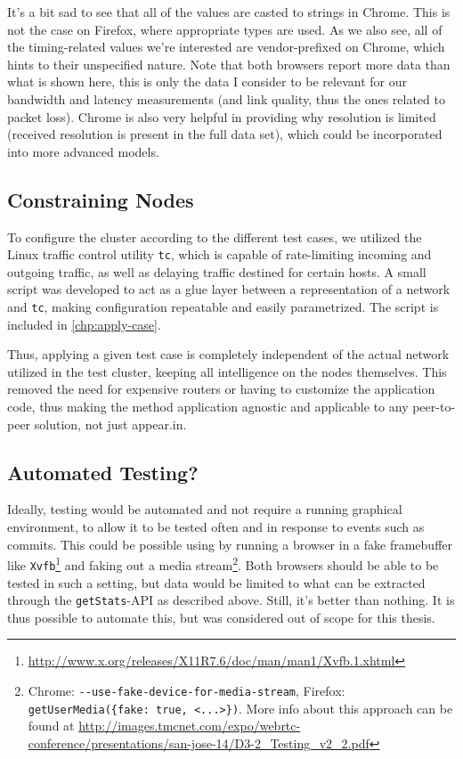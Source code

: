 It's a bit sad to see that all of the values are casted to strings in Chrome. This is not the case on Firefox, where appropriate types are used. As we also see, all of the timing-related values we're interested are vendor-prefixed on Chrome, which hints to their unspecified nature. Note that both browsers report more data than what is shown here, this is only the data I consider to be relevant for our bandwidth and latency measurements (and link quality, thus the ones related to packet loss). Chrome is also very helpful in providing why resolution is limited (received resolution is present in the full data set), which could be incorporated into more advanced models.


\subsection{Constraining Nodes}

To configure the cluster according to the different test cases, we utilized the Linux traffic control utility \texttt{tc}, which is capable of rate-limiting incoming and outgoing traffic, as well as delaying traffic destined for certain hosts. A small script was developed to act as a glue layer between a representation of a network and \texttt{tc}, making configuration repeatable and easily parametrized. The script is included in \autoref{chp:apply-case}.

Thus, applying a given test case is completely independent of the actual network utilized in the test cluster, keeping all intelligence on the nodes themselves. This removed the need for expensive routers or having to customize the application code, thus making the method application agnostic and applicable to any peer-to-peer solution, not just appear.in.


\subsection{Automated Testing?}

Ideally, testing would be automated and not require a running graphical environment, to allow it to be tested often and in response to events such as commits. This could be possible using by running a browser in a fake framebuffer like \texttt{Xvfb}\footnote{\url{http://www.x.org/releases/X11R7.6/doc/man/man1/Xvfb.1.xhtml}} and faking out a media stream\footnote{Chrome: \texttt{-{}-use-fake-device-for-media-stream}, Firefox: \texttt{getUserMedia(\{fake: true, <...>\})}. More info about this approach can be found at \url{http://images.tmcnet.com/expo/webrtc-conference/presentations/san-jose-14/D3-2_Testing_v2_2.pdf}}. Both browsers should be able to be tested in such a setting, but data would be limited to what can be extracted through the \texttt{getStats}-API as described above. Still, it's better than nothing. It is thus possible to automate this, but was considered out of scope for this thesis.


